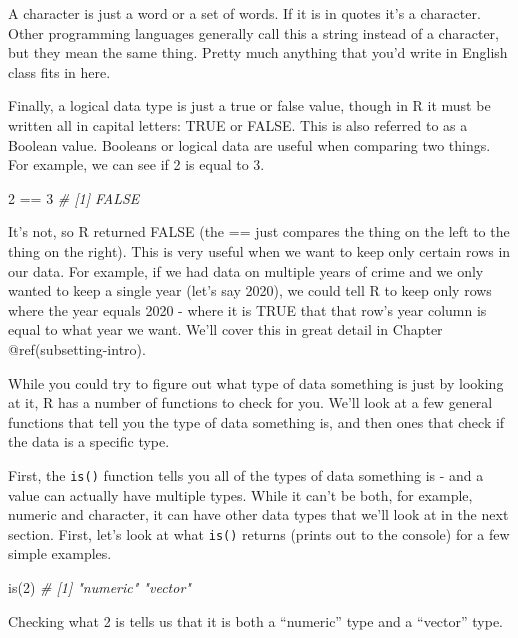 \documentclass[
  a4paper,
]{krantz}
\makeatletter
\newenvironment{Shaded}{\begin{snugshade}}{\end{snugshade}}
\newcommand{\CommentTok}[1]{\textcolor[rgb]{0.56,0.35,0.01}{\textit{#1}}}
\newcommand{\DecValTok}[1]{\textcolor[rgb]{0.00,0.00,0.81}{#1}}
\newcommand{\FunctionTok}[1]{\textcolor[rgb]{0.00,0.00,0.00}{#1}}
\newcommand{\NormalTok}[1]{#1}
\newcommand{\SpecialCharTok}[1]{\textcolor[rgb]{0.00,0.00,0.00}{#1}}
\newenvironment{kframe}{%
\medskip{}
\setlength{\fboxsep}{.8em}
 \def\at@end@of@kframe{}%
 \ifinner\ifhmode%
  \def\at@end@of@kframe{\end{minipage}}%
  \begin{minipage}{\columnwidth}%
 \fi\fi%
 \def\FrameCommand##1{\hskip\@totalleftmargin \hskip-\fboxsep
 \colorbox{shadecolor}{##1}\hskip-\fboxsep
     \hskip-\linewidth \hskip-\@totalleftmargin \hskip\columnwidth}%
 \MakeFramed {\advance\hsize-\width
   \@totalleftmargin\z@ \linewidth\hsize
   \@setminipage}}%
 {\par\unskip\endMakeFramed%
 \at@end@of@kframe}
\renewenvironment{Shaded}{\begin{kframe}}{\end{kframe}}
\makeatother
\begin{document}
A character is just a word or a set of words. If it is in
quotes it's a character. Other programming languages
generally call this a string instead of a character, but
they mean the same thing. Pretty much anything that you'd
write in English class fits in here.

Finally, a logical data type is just a true or false value,
though in R it must be written all in capital letters: TRUE
or FALSE. This is also referred to as a Boolean value.
Booleans or logical data are useful when comparing two
things. For example, we can see if 2 is equal to 3.

\begin{Shaded}
\begin{Highlighting}[]
\DecValTok{2} \SpecialCharTok{==} \DecValTok{3}
\CommentTok{\# [1] FALSE}
\end{Highlighting}
\end{Shaded}

It's not, so R returned FALSE (the == just compares the
thing on the left to the thing on the right). This is very
useful when we want to keep only certain rows in our data.
For example, if we had data on multiple years of crime and
we only wanted to keep a single year (let's say 2020), we
could tell R to keep only rows where the year equals 2020 -
where it is TRUE that that row's year column is equal to
what year we want. We'll cover this in great detail in
Chapter @ref(subsetting-intro).

While you could try to figure out what type of data
something is just by looking at it, R has a number of
functions to check for you. We'll look at a few general
functions that tell you the type of data something is, and
then ones that check if the data is a specific type.

First, the \texttt{is()} function tells you all of the types
of data something is - and a value can actually have
multiple types. While it can't be both, for example, numeric
and character, it can have other data types that we'll look
at in the next section. First, let's look at what
\texttt{is()} returns (prints out to the console) for a few
simple examples.

\begin{Shaded}
\begin{Highlighting}[]
\FunctionTok{is}\NormalTok{(}\DecValTok{2}\NormalTok{)}
\CommentTok{\# [1] "numeric" "vector"}
\end{Highlighting}
\end{Shaded}

Checking what 2 is tells us that it is both a ``numeric''
type and a ``vector'' type.
\end{document}
